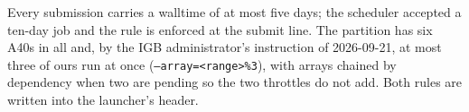  Every  submission carries a
walltime of at most five days; the scheduler accepted a ten-day job and the rule is
enforced at the submit line. The  partition has six A40s in all and, by the IGB
administrator's instruction of 2026-09-21, at most three of ours run at once
(\texttt{--array=<range>\%3}), with arrays chained by dependency when two are pending so
the two throttles do not add. Both rules are written into the launcher's header.

